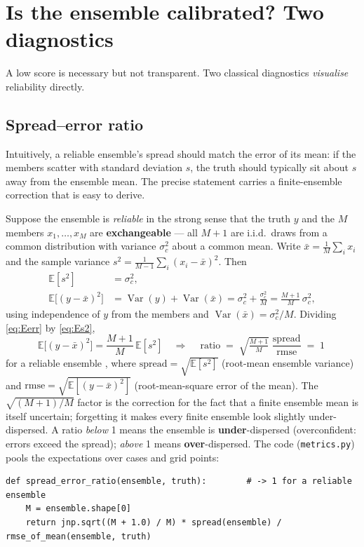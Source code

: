 \documentclass[11pt]{article}
\newcommand{\E}{\mathbb{E}}
\newcommand{\Var}{\operatorname{Var}}
\newcommand{\code}[1]{\texttt{#1}}
\begin{document}
\section{Is the ensemble calibrated? Two diagnostics}\label{sec:diag}

A low score is necessary but not transparent. Two classical diagnostics
\emph{visualise} reliability directly.

\subsection{Spread--error ratio}\label{sec:spreaderror}

Intuitively, a reliable ensemble's spread should match the error of its mean: if
the members scatter with standard deviation $s$, the truth should typically sit
about $s$ away from the ensemble mean. The precise statement carries a
finite-ensemble correction that is easy to derive.

Suppose the ensemble is \emph{reliable} in the strong sense that the truth $y$ and
the $M$ members $x_1,\dots,x_M$ are \textbf{exchangeable} --- all $M{+}1$ are
i.i.d.\ draws from a common distribution with variance $\sigma_c^2$ about a common
mean. Write $\bar x=\tfrac1M\sum_i x_i$ and the sample variance
$s^2=\tfrac{1}{M-1}\sum_i (x_i-\bar x)^2$. Then
\begin{align}
  \E[s^2] &= \sigma_c^2, \label{eq:Es2}\\
  \E\bigl[(y-\bar x)^2\bigr] &= \Var(y) + \Var(\bar x)
     = \sigma_c^2 + \frac{\sigma_c^2}{M} = \frac{M+1}{M}\,\sigma_c^2,
     \label{eq:Eerr}
\end{align}
using independence of $y$ from the members and $\Var(\bar x)=\sigma_c^2/M$.
Dividing \eqref{eq:Eerr} by \eqref{eq:Es2},
\begin{equation}
  \E\bigl[(y-\bar x)^2\bigr] = \frac{M+1}{M}\,\E[s^2]
  \quad\Longrightarrow\quad
  \boxed{\ \text{ratio} \;=\; \sqrt{\tfrac{M+1}{M}}\;\frac{\text{spread}}{\text{rmse}} \;=\; 1\ }
  \label{eq:sprerr}
\end{equation}
for a reliable ensemble \citep{fortin2014,leutbecher2018}, where
$\text{spread}=\sqrt{\E[s^2]}$ (root-mean ensemble variance) and
$\text{rmse}=\sqrt{\E[(y-\bar x)^2]}$ (root-mean-square error of the mean). The
$\sqrt{(M{+}1)/M}$ factor is the correction for the fact that a finite ensemble
mean is itself uncertain; forgetting it makes every finite ensemble look slightly
under-dispersed. A ratio \emph{below} 1 means the ensemble is
\textbf{under}-dispersed (overconfident: errors exceed the spread); \emph{above}
1 means \textbf{over}-dispersed. The code (\code{metrics.py}) pools the
expectations over cases and grid points:
\begin{lstlisting}
def spread_error_ratio(ensemble, truth):        # -> 1 for a reliable ensemble
    M = ensemble.shape[0]
    return jnp.sqrt((M + 1.0) / M) * spread(ensemble) / rmse_of_mean(ensemble, truth)
\end{lstlisting}
\end{document}
